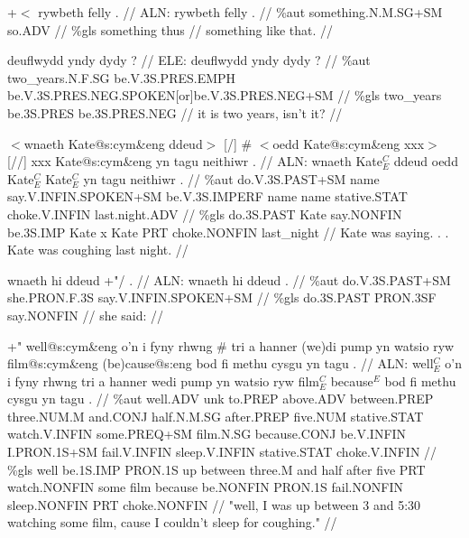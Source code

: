 \documentclass[a4paper,10pt]{article}
\begin{document}
\ex
\begingl[lingstyle=gergl]
\glchat +$<$ rywbeth felly . //
\glsurface ALN:  rywbeth felly .  //
\glauto \%aut  something{\scriptsize .N.M.SG+SM} so{\scriptsize .ADV}   //
\glmanual \%gls  something thus   //
\gleng something like that. //
\endgl
\xe

\ex
\begingl[lingstyle=gergl]
\glchat deuflwydd yndy dydy ? //
\glsurface ELE:  deuflwydd yndy dydy ?  //
\glauto \%aut  two\_years{\scriptsize .N.F.SG} be{\scriptsize .V.3S.PRES.EMPH} be{\scriptsize .V.3S.PRES.NEG.SPOKEN[or]be.V.3S.PRES.NEG+SM}   //
\glmanual \%gls  two\_years be{\scriptsize .3S.PRES} be{\scriptsize .3S.PRES.NEG}   //
\gleng it is two years, isn't it? //
\endgl
\xe

\ex
\begingl[lingstyle=gergl]
\glchat $<$wnaeth Kate@s:cym\&eng ddeud$>$ [/] \# $<$oedd Kate@s:cym\&eng xxx$>$ [//] xxx Kate@s:cym\&eng yn tagu neithiwr . //
\glsurface ALN:  wnaeth Kate$^{C}_{E}$ ddeud oedd Kate$^{C}_{E}$ Kate$^{C}_{E}$ yn tagu neithiwr .  //
\glauto \%aut  do{\scriptsize .V.3S.PAST+SM} name say{\scriptsize .V.INFIN.SPOKEN+SM} be{\scriptsize .V.3S.IMPERF} name name stative{\scriptsize .STAT} choke{\scriptsize .V.INFIN} last{\scriptsize .night.ADV}   //
\glmanual \%gls  do{\scriptsize .3S.PAST} Kate say{\scriptsize .NONFIN} be{\scriptsize .3S.IMP} Kate x Kate PRT choke{\scriptsize .NONFIN} last\_night  //
\gleng Kate was saying. . . Kate was coughing last night. //
\endgl
\xe

\ex
\begingl[lingstyle=gergl]
\glchat wnaeth hi ddeud +"/ . //
\glsurface ALN:  wnaeth hi ddeud .  //
\glauto \%aut  do{\scriptsize .V.3S.PAST+SM} she{\scriptsize .PRON.F.3S} say{\scriptsize .V.INFIN.SPOKEN+SM}   //
\glmanual \%gls  do{\scriptsize .3S.PAST} PRON{\scriptsize .3SF} say{\scriptsize .NONFIN}   //
\gleng she said: //
\endgl
\xe

\ex
\begingl[lingstyle=gergl]
\glchat +" well@s:cym\&eng o'n i fyny rhwng \# tri a hanner (we)di pump yn watsio ryw film@s:cym\&eng (be)cause@s:eng bod fi methu cysgu yn tagu . //
\glsurface ALN:  well$^{C}_{E}$ o'n i fyny rhwng tri a hanner wedi pump yn watsio ryw film$^{C}_{E}$ because$^{E}$ bod fi methu cysgu yn tagu .  //
\glauto \%aut  well{\scriptsize .ADV} unk to{\scriptsize .PREP} above{\scriptsize .ADV} between{\scriptsize .PREP} three{\scriptsize .NUM.M} and{\scriptsize .CONJ} half{\scriptsize .N.M.SG} after{\scriptsize .PREP} five{\scriptsize .NUM} stative{\scriptsize .STAT} watch{\scriptsize .V.INFIN} some{\scriptsize .PREQ+SM} film{\scriptsize .N.SG} because{\scriptsize .CONJ} be{\scriptsize .V.INFIN} I{\scriptsize .PRON.1S+SM} fail{\scriptsize .V.INFIN} sleep{\scriptsize .V.INFIN} stative{\scriptsize .STAT} choke{\scriptsize .V.INFIN}   //
\glmanual \%gls  well be{\scriptsize .1S.IMP} PRON{\scriptsize .1S} up between three{\scriptsize .M} and half after five PRT watch{\scriptsize .NONFIN} some film because be{\scriptsize .NONFIN} PRON{\scriptsize .1S} fail{\scriptsize .NONFIN} sleep{\scriptsize .NONFIN} PRT choke{\scriptsize .NONFIN}   //
\gleng "well, I was up between 3 and 5:30 watching some film, cause I couldn't sleep for coughing." //
\endgl
\xe
\end{document}
